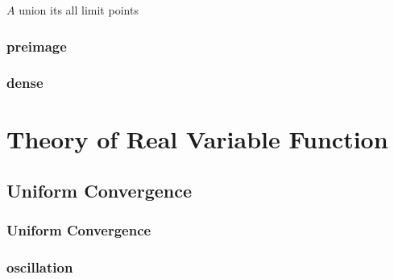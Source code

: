 \documentclass[11pt,a4paper]{article}
\begin{document}
$A$ union its all limit points

\subsubsection{preimage}

\subsubsection{dense}

\section{Theory of Real Variable Function}

\subsection{Uniform Convergence}

\subsubsection{Uniform Convergence}

\subsubsection{oscillation}
\end{document}
